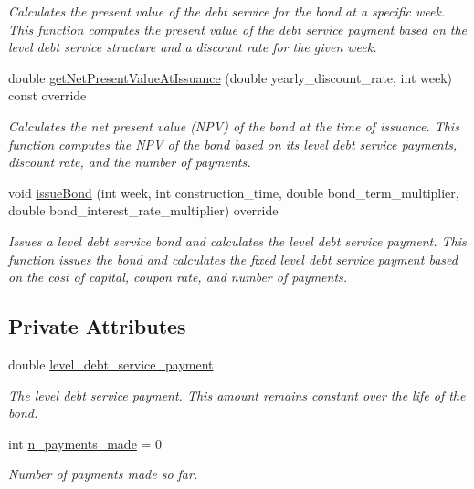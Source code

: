 \begin{DoxyCompactItemize}
\begin{DoxyCompactList}\small\item\em Calculates the present value of the debt service for the bond at a specific week. This function computes the present value of the debt service payment based on the level debt service structure and a discount rate for the given week. \end{DoxyCompactList}\item 
double \mbox{\hyperlink{classLevelDebtServiceBond_a0f5820c3e76b8b908dbe153a8291d96a}{get\+Net\+Present\+Value\+At\+Issuance}} (double yearly\+\_\+discount\+\_\+rate, int week) const override
\begin{DoxyCompactList}\small\item\em Calculates the net present value (N\+PV) of the bond at the time of issuance. This function computes the N\+PV of the bond based on its level debt service payments, discount rate, and the number of payments. \end{DoxyCompactList}\item 
void \mbox{\hyperlink{classLevelDebtServiceBond_a51a54a1a25be105b168bf86489aee417}{issue\+Bond}} (int week, int construction\+\_\+time, double bond\+\_\+term\+\_\+multiplier, double bond\+\_\+interest\+\_\+rate\+\_\+multiplier) override
\begin{DoxyCompactList}\small\item\em Issues a level debt service bond and calculates the level debt service payment. This function issues the bond and calculates the fixed level debt service payment based on the cost of capital, coupon rate, and number of payments. \end{DoxyCompactList}\end{DoxyCompactItemize}
\subsection*{Private Attributes}
\begin{DoxyCompactItemize}
\item 
double \mbox{\hyperlink{classLevelDebtServiceBond_a2af3b9ff7546bd002f78d07dbf696c64}{level\+\_\+debt\+\_\+service\+\_\+payment}}
\begin{DoxyCompactList}\small\item\em The level debt service payment. This amount remains constant over the life of the bond. \end{DoxyCompactList}\item 
int \mbox{\hyperlink{classLevelDebtServiceBond_ad1b8ba91ef3702a5eecfe3075fed0bc3}{n\+\_\+payments\+\_\+made}} = 0
\begin{DoxyCompactList}\small\item\em Number of payments made so far. \end{DoxyCompactList}\end{DoxyCompactItemize}
